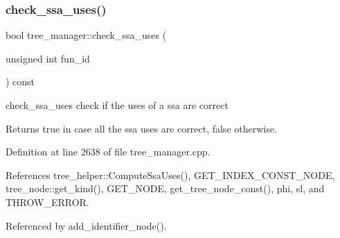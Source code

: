 \subsubsection{\texorpdfstring{check\+\_\+ssa\+\_\+uses()}{check\_ssa\_uses()}}
{\footnotesize\ttfamily bool tree\+\_\+manager\+::check\+\_\+ssa\+\_\+uses (\begin{DoxyParamCaption}\item[{unsigned int}]{fun\+\_\+id }\end{DoxyParamCaption}) const}



check\+\_\+ssa\+\_\+uses check if the uses of a ssa are correct 

\begin{DoxyReturn}{Returns}
true in case all the ssa uses are correct, false otherwise. 
\end{DoxyReturn}


Definition at line 2638 of file tree\+\_\+manager.\+cpp.



References tree\+\_\+helper\+::\+Compute\+Ssa\+Uses(), G\+E\+T\+\_\+\+I\+N\+D\+E\+X\+\_\+\+C\+O\+N\+S\+T\+\_\+\+N\+O\+DE, tree\+\_\+node\+::get\+\_\+kind(), G\+E\+T\+\_\+\+N\+O\+DE, get\+\_\+tree\+\_\+node\+\_\+const(), phi, sl, and T\+H\+R\+O\+W\+\_\+\+E\+R\+R\+OR.



Referenced by add\+\_\+identifier\+\_\+node().

